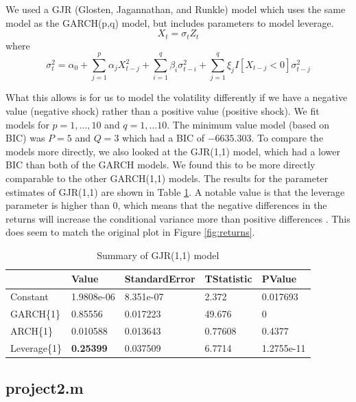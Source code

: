 \documentclass{article}
\begin{document}
We used a GJR (Glosten, Jagannathan, and Runkle) \cite{gjr1993} model which uses the same model as the GARCH(p,q) model, but includes parameters to model leverage.
$$
X_t = \sigma_t Z_t
$$
where
$$
\sigma_t^2 = \alpha_0 + \sum_{j = 1}^p \alpha_j X_{t - j}^2 + \sum_{i = 1}^q \beta_i \sigma_{t - i}^2 + \sum_{j = 1}^q \xi_j I [X_{t - j} < 0] \sigma_{t - j}^2
$$

What this allows is for us to model the volatility differently if we have a negative value (negative shock) rather than a positive value (positive shock).
We fit models for $p = 1,\ldots, 10$ and $q = 1,\ldots 10$. The minimum value model (based on BIC) was $P = 5$ and $Q = 3$ which had a BIC of $-6635.303$.
To compare the models more directly, we also looked at the GJR(1,1) model, which had a lower BIC than both of the GARCH models.
We found this to be more directly comparable to the other GARCH(1,1) models.
The results for the parameter estimates of GJR(1,1) are shown in Table \ref{tab:gjr_summary}.
A notable value is that the leverage parameter is higher than 0, which means that the negative differences in the returns will increase the conditional variance more than positive differences \cite{leverage2017}.
This does seem to match the original plot in Figure \ref{fig:returns}.

\begin{table}[H]
  \centering
\begin{tabular}{l | l l l l}
  & Value & StandardError  &  TStatistic  &    PValue                      \\
  \hline
Constant & 1.9808e-06   &   8.351e-07    &     2.372    &    0.017693   \\
GARCH\{1\}    &      0.85556   &    0.017223   &     49.676    &           0 \\
ARCH\{1\}    &      0.010588   &    0.013643   &    0.77608   &       0.4377 \\
Leverage\{1\}   &    \textbf{0.25399}   &    0.037509   &     6.7714  &    1.2755e-11
\end{tabular}
\caption{Summary of GJR(1,1) model}
\label{tab:gjr_summary}
\end{table}

\begin{appendices}

\subsection{project2.m}


\end{appendices}



\end{document}
